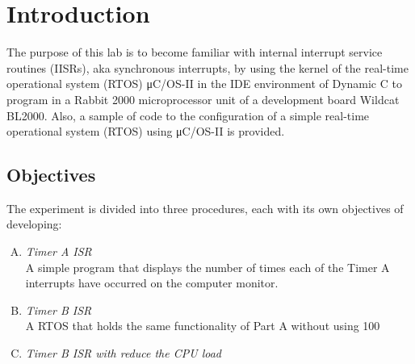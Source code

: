 \section{Introduction}

The purpose of this lab is to become familiar with internal interrupt service routines (IISRs), aka synchronous interrupts, by using the kernel of the real-time operational system (RTOS) μC/OS-II in the IDE environment of Dynamic C to program in a Rabbit 2000 microprocessor unit of a development board Wildcat BL2000. Also, a sample of code to the configuration of a simple real-time operational system (RTOS) using μC/OS-II is provided.

\subsection{Objectives}
The experiment is divided into three procedures, each with its own objectives of developing:

\begin{enumerate}[A.]
\item
\textit{Timer A ISR}
\\A simple program that displays the number of times each of the Timer A interrupts have occurred on the computer monitor.
\\
\item
\textit{Timer B ISR}
\\A RTOS that holds the same functionality of Part A without using 100%
\\
\item
\textit{Timer B ISR with reduce the CPU load}
\\
\\
\end{enumerate}